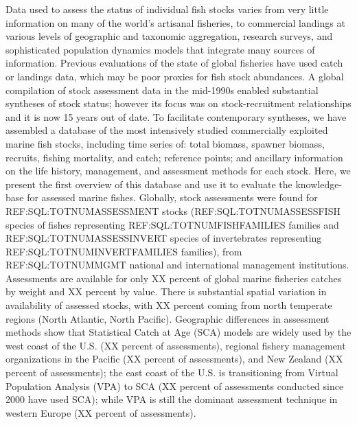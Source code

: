 
Data used to assess the status of individual fish stocks varies from
very little information on many of the world's artisanal fisheries, to
commercial landings at various levels of geographic and taxonomic
aggregation, research surveys, and sophisticated population dynamics
models that integrate many sources of information.  Previous
evaluations of the state of global fisheries have used catch or
landings data, which may be poor proxies for fish stock abundances. A
global compilation of stock assessment data in the mid-1990s enabled
substantial syntheses of stock status; however its focus was on
stock-recruitment relationships and it is now 15 years out of date. To
facilitate contemporary syntheses, we have assembled a database of the
most intensively studied commercially exploited marine fish stocks,
including time series of: total biomass, spawner biomass, recruits,
fishing mortality, and catch; reference points; and ancillary
information on the life history, management, and assessment methods
for each stock.  Here, we present the first overview of this database
and use it to evaluate the knowledge-base for assessed marine fishes.
Globally, stock assessments were found for REF:SQL:TOTNUMASSESSMENT
stocks (REF:SQL:TOTNUMASSESSFISH species of fishes representing
REF:SQL:TOTNUMFISHFAMILIES families and REF:SQL:TOTNUMASSESSINVERT
species of invertebrates representing REF:SQL:TOTNUMINVERTFAMILIES
families), from REF:SQL:TOTNUMMGMT national and international
management institutions. Assessments are available for only XX percent
of global marine fisheries catches by weight and XX percent by value.
There is substantial spatial variation in availability of assessed
stocks, with XX percent coming from north temperate regions (North
Atlantic, North Pacific).  Geographic differences in assessment
methods show that Statistical Catch at Age (SCA) models are widely
used by the west coast of the U.S. (XX percent of assessments),
regional fishery management organizations in the Pacific (XX percent
of assessments), and New Zealand (XX percent of assessments); the east
coast of the U.S. is transitioning from Virtual Population Analysis
(VPA) to SCA (XX percent of assessments conducted since 2000 have used
SCA); while VPA is still the dominant assessment
technique in western Europe (XX percent of assessments).\\


